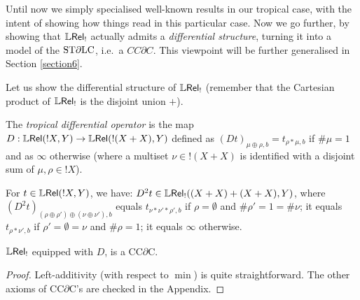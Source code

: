 Until now we simply specialised well-known results in our tropical case, with the intent of showing how things read in this particular case.
Now we go further, by showing that $\mathbb{L} \mathsf{Rel}_!$ actually admits a \emph{differential structure}, turning it into a model of the $\mathrm{ST}\partial\mathrm{LC}$, i.e.~a $CC\partial C$.
This viewpoint
will be further generalised in Section \ref{section6}.

%
%

Let us show the differential structure of $\mathbb{L} \mathsf{Rel}_!$ (remember that the Cartesian product of $\mathbb{L} \mathsf{Rel}_!$ is the disjoint union $+$).

\begin{definition}
 The \emph{tropical differential operator} is the map $D:{\mathbb{L} \mathsf{Rel}}(!X,Y)\to {\mathbb{L}\mathsf{Rel}}(!(X+X),Y)$ defined as $(Dt)_{\mu\oplus\rho,b}=t_{\rho*\mu,b}$ if $\#\mu=1$ and as $\infty$ otherwise (where a multiset $\nu \in !(X+X)$ is identified with a disjoint sum of $\mu,\rho\in !X$).
\end{definition}

\begin{remark}
For $t\in{\mathbb{L}\mathsf{Rel}}(!X,Y)$, we have:
 $D^2 t\in{\mathbb{L}\mathsf{Rel}_!}((X+X)+(X+X),Y)$, where $(D^2 t)_{(\rho\oplus\rho')\oplus(\nu\oplus\nu'),b}$ equals $t_{\nu*\nu'*\rho',b}$ if $\rho=\emptyset$ and $\#\rho'=1=\#\nu$; it equals $t_{\rho*\nu',b}$ if $\rho'=\emptyset=\nu$ and $\#\rho=1$; it equals $\infty$ otherwise.
\end{remark}

\begin{theorem}\label{thm:LREL!CCDC}
 $\mathbb{L} \mathsf{Rel}_!$ equipped with $D$, is a CC$\partial$C.
\end{theorem}
\begin{proof}
 Left-additivity (with respect to $\min$) is quite straightforward.
 The other axioms of CC$\partial$C's are checked in the Appendix.
\end{proof}

